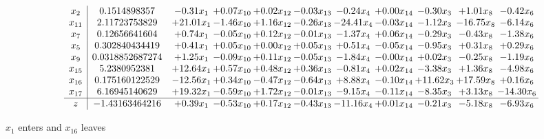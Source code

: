 \documentclass[9pt]{article}
\begin{document}
 \[\begin{array}{c| c c@{\hskip 2pt} c@{\hskip 2pt} c@{\hskip 2pt} c@{\hskip 2pt} c@{\hskip 2pt} c@{\hskip 2pt} c@{\hskip 2pt} c@{\hskip 2pt} c@{\hskip 2pt} }
 x_{2}   &  0.1514898357 & -0.31 x_{1} & +  0.07 x_{10} & +  0.02 x_{12} & -0.03 x_{13} & -0.24 x_{4} & +  0.00 x_{14} & -0.30 x_{3} & +  1.01 x_{8} & -0.42 x_{6}\\
 x_{11}   &  2.11723753829 & + 21.01 x_{1} & -1.46 x_{10} & +  1.16 x_{12} & -0.26 x_{13} & -24.41 x_{4} & -0.03 x_{14} & -1.12 x_{3} & -16.75 x_{8} & -6.14 x_{6}\\
 x_{7}   &  0.12656641604 & +  0.74 x_{1} & -0.05 x_{10} & +  0.12 x_{12} & -0.01 x_{13} & -1.37 x_{4} & +  0.06 x_{14} & -0.29 x_{3} & -0.43 x_{8} & -1.38 x_{6}\\
 x_{5}   &  0.302840434419 & +  0.41 x_{1} & +  0.05 x_{10} & +  0.00 x_{12} & +  0.05 x_{13} & +  0.51 x_{4} & -0.05 x_{14} & -0.95 x_{3} & +  0.31 x_{8} & +  0.29 x_{6}\\
 x_{9}   &  0.0318852687274 & +  1.25 x_{1} & -0.09 x_{10} & +  0.11 x_{12} & -0.05 x_{13} & -1.84 x_{4} & -0.00 x_{14} & +  0.02 x_{3} & -0.25 x_{8} & -1.19 x_{6}\\
 x_{15}   &  5.2380952381 & + 12.64 x_{1} & +  0.57 x_{10} & +  0.48 x_{12} & +  0.36 x_{13} & -0.81 x_{4} & +  0.02 x_{14} & -3.38 x_{3} & +  1.36 x_{8} & -4.98 x_{6}\\
 x_{16}   &  0.175160122529 & -12.56 x_{1} & +  0.34 x_{10} & -0.47 x_{12} & -0.64 x_{13} & +  8.88 x_{4} & -0.10 x_{14} & + 11.62 x_{3} & + 17.59 x_{8} & +  0.16 x_{6}\\
 x_{17}   &  6.16945140629 & + 19.32 x_{1} & -0.59 x_{10} & +  1.72 x_{12} & -0.01 x_{13} & -9.15 x_{4} & -0.11 x_{14} & -8.35 x_{3} & +  3.13 x_{8} & -14.30 x_{6}\\
\hline
z    &  -1.43163464216 & +  0.39 x_{1} & -0.53 x_{10} & +  0.17 x_{12} & -0.43 x_{13} & -11.16 x_{4} & +  0.01 x_{14} & -0.21 x_{3} & -5.18 x_{8} & -6.93 x_{6}\\
\end{array}\]


 $ x_{1} $ enters and $ x_{16} $ leaves 
\end{document}
